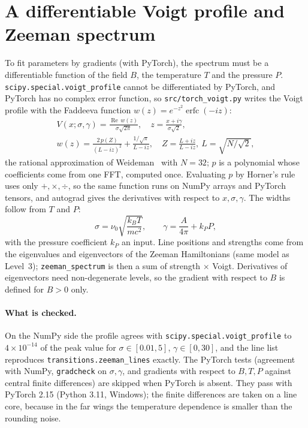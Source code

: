 \section{A differentiable Voigt profile and Zeeman spectrum}
To fit parameters by gradients (with PyTorch), the spectrum must be a differentiable function of the field $B$, the temperature $T$ and the pressure $P$. \texttt{scipy.special.voigt\_profile} cannot be differentiated by PyTorch, and PyTorch has no complex error function, so \texttt{src/torch\_voigt.py} writes the Voigt profile with the Faddeeva function $w(z)=e^{-z^2}\operatorname{erfc}(-iz)$:
\begin{equation}\begin{split}
V(x;\sigma,\gamma)=\frac{\operatorname{Re}\,w(z)}{\sigma\sqrt{2\pi}},\quad z=\frac{x+i\gamma}{\sigma\sqrt2},\\
 w(z)=\frac{2\,p(Z)}{(L-iz)^2}+\frac{1/\sqrt\pi}{L-iz},\quad Z=\frac{L+iz}{L-iz},\ L=\sqrt{N/\sqrt2},
\end{split}\end{equation}
the rational approximation of Weideman~\cite{weideman} with $N=32$; $p$ is a polynomial whose coefficients come from one FFT, computed once. Evaluating $p$ by Horner's rule uses only $+,\times,\div$, so the same function runs on NumPy arrays and PyTorch tensors, and autograd gives the derivatives with respect to $x,\sigma,\gamma$. The widths follow from $T$ and $P$:
\begin{equation}
\sigma=\nu_0\sqrt{\frac{k_BT}{mc^2}},\qquad \gamma=\frac{A}{4\pi}+k_PP,
\end{equation}
with the pressure coefficient $k_P$ an input. Line positions and strengths come from the eigenvalues and eigenvectors of the Zeeman Hamiltonians (same model as Level~3); \texttt{zeeman\_spectrum} is then a sum of strength $\times$ Voigt. Derivatives of eigenvectors need non-degenerate levels, so the gradient with respect to $B$ is defined for $B>0$ only.

\paragraph{What is checked.} On the NumPy side the profile agrees with \texttt{scipy.special.voigt\_profile} to $4\times10^{-14}$ of the peak value for $\sigma\in[0.01,5]$, $\gamma\in[0,30]$, and the line list reproduces \texttt{transitions.zeeman\_lines} exactly. The PyTorch tests (agreement with NumPy, \texttt{gradcheck} on $\sigma,\gamma$, and gradients with respect to $B,T,P$ against central finite differences) are skipped when PyTorch is absent. They pass with PyTorch 2.15 (Python 3.11, Windows); the finite differences are taken on a line core, because in the far wings the temperature dependence is smaller than the rounding noise.
